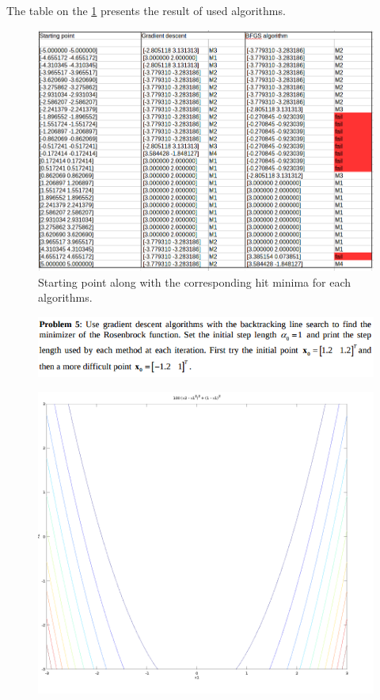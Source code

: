 \documentclass[eng,openany]{mgr}
\begin{document}
The table on the \ref{fig:screenshot014} presents the result of used algorithms.
\begin{figure}[h]
\centering
\includegraphics[width=0.8\linewidth]{screenshot014}
\caption{Starting point along with the corresponding hit minima for each algorithms.}
\label{fig:screenshot014}
\end{figure}

\clearpage

\begin{figure}[h]
\centering
\includegraphics[width=0.7\linewidth]{screenshot015}
\label{fig:screenshot015}
\end{figure}


\begin{figure}[h]
\centering
\includegraphics[width=0.5\linewidth]{screenshot019}
\label{fig:screenshot019}
\end{figure}
\end{document}
